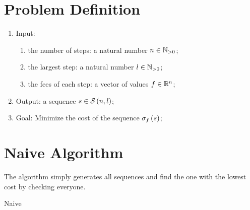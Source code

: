 \section{Problem Definition}

\begin{enumerate}
    \item Input:
    \begin{enumerate}
        \item the number of steps: a natural number $n \in \mathbb{N}_{>0}$;
        \item the largest step: a natural number $l \in \mathbb{N}_{>0}$;
        \item the fees of each step: a vector of values $f \in \mathbb{R}^{n}$;
    \end{enumerate}
    \item Output: a sequence $s \in \mathcal{S} \left( n, l \right)$;
    \item Goal: Minimize the cost of the sequence $\sigma_{f} \left( s \right)$;
\end{enumerate}

\section{Naive Algorithm}

The algorithm simply generates all sequences and find the one with the lowest cost by checking everyone.

\begin{algorithm}[H]
    \caption{Naive}
    \label{stairway-to-heaven-2:algorithm:naive}
    \begin{algorithmic}[1]
        \Require{$\nSteps \in \oneN, \stepLimit \in \oneN, \fees \in \R^\nSteps$}
    \end{algorithmic}
\end{algorithm}
